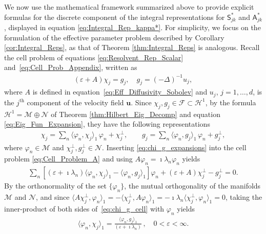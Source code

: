 \documentclass[leqno,onefignum,onetabnum]{siamltex1213}
\newcommand{\Mc}{\mathcal{M}}
\newcommand{\Nc}{\mathcal{N}}
\newcommand{\Sm}{\mathsf{S}}
\newcommand{\Am}{\mathsf{A}}
\newcommand{\Hs}{\mathscr{H}}
\newcommand{\Fs}{\mathscr{F}}
\newcommand{\vecu}{\boldsymbol{u}}
\begin{document}
We now use the mathematical framework summarized above to provide
explicit formulas for the discrete component of the integral
representations for $\Sm^*_{jk}$ and $\Am^*_{jk}$, displayed in equation
\eqref{eq:Integral_Rep_kappa*}. For simplicity, we focus on the
formulation of the effective parameter problem described by Corollary
\ref{cor:Integral_Reps}, as that of Theorem \ref{thm:Integral_Reps} is
analogous. Recall the cell problem of equations
\eqref{eq:Resolvent_Rep_Scalar} and~\eqref{eq:Cell_Prob_Appendix}, 
written as 
% 
\begin{align}\label{eq:Cell_Problem_A}
  (\varepsilon+A)\chi_j=g_j, \quad g_j=(-\Delta)^{-1}u_j,
\end{align}
%
where $A$ is defined in equation~\eqref{eq:Eff_Diffusivity_Sobolev} 
and $u_j$, $j=1,\ldots,d$, is the $j^{\text{th}}$ component of the velocity field
$\vecu $. Since $\chi_j,g_j\in\Fs\subset\Hs^1$, by the formula
$\Hs^1=\Mc\oplus\Nc$ of Theorem \ref{thm:Hilbert_Eig_Decomp} and equation
\eqref{eq:Eig_Fun_Expansion}, they have the following representations    
%
\begin{align}\label{eq:chi_g_expansions}
  \chi_j=\sum_n\langle\varphi_n,\chi_j\rangle_1\,\varphi_n +\chi_j^\perp, \qquad  g_j=\sum_n\langle\varphi_n,g_j\rangle_1\,\varphi_n +g_j^\perp,
\end{align}
%
where $\varphi_n\in\Mc$ and $\chi_j^\perp,g_j^\perp\in\Nc$. Inserting
\eqref{eq:chi_g_expansions} into the cell problem
\eqref{eq:Cell_Problem_A} and using $A\varphi_n=\imath\lambda_n\varphi_n$ yields
%
\begin{align}\label{eq:chi_g_cell}
  \sum_n[(\varepsilon+\imath\lambda_n)\langle\varphi_n,\chi_j\rangle_1-\langle\varphi_n,g_j\rangle_1]\varphi_n+(\varepsilon+A)\chi_j^\perp-g_j^\perp=0.
\end{align}
%
By the orthonormality of the set $\{\varphi_n\}$, the mutual orthogonality of
the manifolds $\Mc$ and $\Nc$, and since
$\langle A\chi_j^\perp,\varphi_n\rangle_1=-\langle\chi_j^\perp,A\varphi_n\rangle_1=-\imath\lambda_n\langle\chi_j^\perp,\varphi_n\rangle_1=0$, taking the
inner-product of both sides of~\eqref{eq:chi_g_cell} with $\varphi_n$ yields   
%
\begin{align}\label{eq:Coefficients}
  \langle\varphi_n,\chi_j\rangle_1=\frac{\langle\varphi_n,g_j\rangle_1}{(\varepsilon+\imath\lambda_n)}\,, \quad
  0<\varepsilon<\infty.
\end{align}
%
\end{document}
